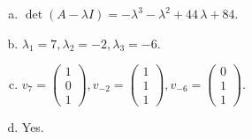 \begin{questions}
\begin{solution}
\begin{enumerate}[(a)]
\item $\det(A-\lambda I)=-{\lambda}^{3} - {\lambda}^{2} + 44 \, {\lambda} + 84$.
\item ${\lambda}_1=7, {\lambda}_2=-2, {\lambda}_3=-6$.
\item $v_{7}=\left(\begin{array}{r}
1 \\
0 \\
1
\end{array}\right), v_{-2}=\left(\begin{array}{r}
1 \\
1 \\
1
\end{array}\right), v_{-6}=\left(\begin{array}{r}
0 \\
1 \\
1
\end{array}\right)$.
\item Yes.
\end{enumerate}
\end{solution}

\end{questions}

\newpage


\begin{center}
\end{center}

